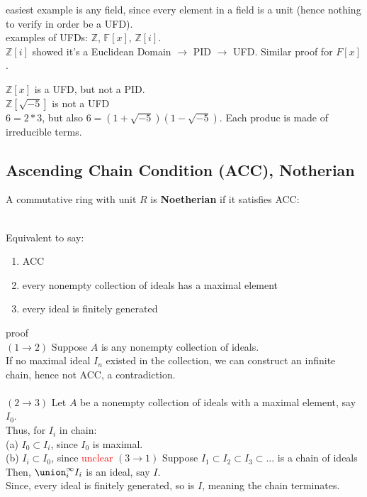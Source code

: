 \documentclass[12pt]{article}
\begin{document}
easiest example is any field, since every element in a field is a unit (hence nothing to verify in order be a UFD).\\

examples of UFDs: $\mathbb{Z}$, $\mathbb{F}[x]$, $\mathbb{Z}[i]$.\\
\textcolor[gray]{0.5}{$\mathbb{Z}[i]$ showed it's a Euclidean Domain $\rightarrow$ PID $\rightarrow$ UFD. Similar proof for $F[x]$.}

$\mathbb{Z}[x]$ is a UFD, but not a PID.\\

$\mathbb{Z}[\sqrt{-5}]$ is not a UFD\\
\textcolor[gray]{0.5}{$6 = 2 *3$, but also  $6 = (1 + \sqrt{-5})(1-\sqrt{-5})$. Each produc is made of irreducible terms.}

\subsection*{Ascending Chain Condition (ACC), Notherian}

A commutative ring with unit $R$ is \textbf{Noetherian} if it satisfies ACC: \\

\ \\
Equivalent to say: 
\begin{enumerate}
    \item ACC
    \item every nonempty collection of ideals has a maximal element
    \item every ideal is finitely generated
\end{enumerate}
\textcolor[gray]{0.5}{proof\\
$(1 \rightarrow 2)$ Suppose $A$ is any nonempty collection of ideals.\\
If no maximal ideal $I_n$ existed in the collection, we can construct an infinite chain, hence not ACC, a contradiction.\\
\ \\
$(2 \rightarrow 3)$ Let $A$ be a nonempty collection of ideals with a maximal element, say $I_0$.\\
Thus, for $I_i$ in chain: \\
(a) $I_0 \subset I_i$, since $I_0$ is maximal.\\
(b) $I_i \subset I_0$, since \textcolor{red}{unclear}
$(3 \rightarrow 1)$ Suppose $I_1 \subset I_2 \subset I_3 \subset ...$ is a chain of ideals\\
Then, $\displaystyle \union_{i}^\infty I_i$ is an ideal, say $I$.\\
Since, every ideal is finitely generated, so is $I$, meaning the chain terminates.
}
\end{document}
